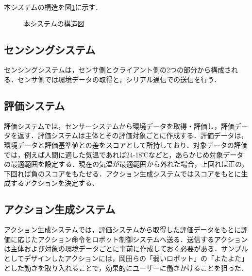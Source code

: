 \documentclass[paper=a4paper,jafontsize=9pt,head_space=15mm,gutter=20mm,
twocolumn,number_of_lines=49, line_length=26zw]{myuarticle}
\begin{document}
本システムの構造を図\ref{fig:system-structure}に示す．

\fboxsep=0pt            %
\fboxrule=1pt            %
\begin{figure}[h]
  \centering
  \caption{本システムの構造図}
  \label{fig:system-structure}
\end{figure}

\subsection{センシングシステム}

センシングシステムは，センサ側とクライアント側の2つの部分から構成される．センサ側では環境データの取得と，シリアル通信での送信を行う．

\subsection{評価システム}
評価システムでは，センサーシステムから環境データを取得・評価し，評価データを返す．評価システムは主体とその評価対象ごとに作成する．評価データは，環境データと評価基準値との差をスコアとして所持しており．対象データの評価では，例えば人間に適した気温であれば24-18℃などと，あらかじめ対象データの最適範囲を設定する．現在の気温が最適範囲から外れた場合，上回れば正の，下回れば負のスコアをもたせる．アクション生成システムではスコアをもとに生成するアクションを決定する．

\subsection{アクション生成システム}
アクション生成システムでは，評価システムから取得した評価データをもとに評価に応じたアクション命令をロボット制御システムへ送る．送信するアクションは主体および対象の環境データごとに事前に作成しておく必要がある．サンプルとしてデザインしたアクションには，岡田ら\cite{岡田-2017-弱いロボ}の「弱いロボット」の「よたよた」とした動きを取り入れることで，効果的にユーザーに働きかけることを狙った．
\end{document}
